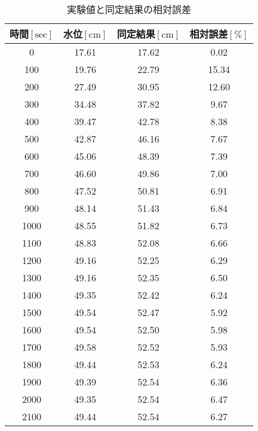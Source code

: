 \begin{table}[h]
  \begin{center}
    \caption{実験値と同定結果の相対誤差}
    \begin{tabular}{|c|c|c|c|} \hline
      時間$\mathrm{[sec]}$ & 水位$\mathrm{[cm]}$ & 同定結果$\mathrm{[cm]}$ & 相対誤差$\mathrm{[\%]}$ \\ \hline \hline
0    & 17.61 & 17.62 &  0.02 \\ \hline
100  & 19.76 & 22.79 & 15.34 \\ \hline
200  & 27.49 & 30.95 & 12.60 \\ \hline
300  & 34.48 & 37.82 &  9.67 \\ \hline
400  & 39.47 & 42.78 &  8.38 \\ \hline
500  & 42.87 & 46.16 &  7.67 \\ \hline
600  & 45.06 & 48.39 &  7.39 \\ \hline
700  & 46.60 & 49.86 &  7.00 \\ \hline
800  & 47.52 & 50.81 &  6.91 \\ \hline
900  & 48.14 & 51.43 &  6.84 \\ \hline
1000 & 48.55 & 51.82 &  6.73 \\ \hline
1100 & 48.83 & 52.08 &  6.66 \\ \hline
1200 & 49.16 & 52.25 &  6.29 \\ \hline
1300 & 49.16 & 52.35 &  6.50 \\ \hline
1400 & 49.35 & 52.42 &  6.24 \\ \hline
1500 & 49.54 & 52.47 &  5.92 \\ \hline
1600 & 49.54 & 52.50 &  5.98 \\ \hline
1700 & 49.58 & 52.52 &  5.93 \\ \hline
1800 & 49.44 & 52.53 &  6.24 \\ \hline
1900 & 49.39 & 52.54 &  6.36 \\ \hline
2000 & 49.35 & 52.54 &  6.47 \\ \hline
2100 & 49.44 & 52.54 &  6.27 \\ \hline
    \end{tabular}
    \label{tab:data4}
  \end{center}
\end{table}
